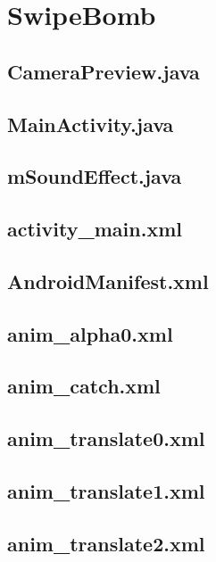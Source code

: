 \documentclass[11pt,a4j]{jarticle}
\begin{document}
\section{SwipeBomb}
\subsection{CameraPreview.java}
	
	\newpage
\subsection{MainActivity.java}
	
	\newpage
\subsection{mSoundEffect.java}
	
	\newpage

\subsection{activity\_main.xml}
	
	\newpage
\subsection{AndroidManifest.xml}
	
	\newpage
\subsection{anim\_alpha0.xml}
	
	\newpage
\subsection{anim\_catch.xml}
	
	\newpage
\subsection{anim\_translate0.xml}
	
	\newpage
\subsection{anim\_translate1.xml}
	
	\newpage
\subsection{anim\_translate2.xml}
	
	\newpage
\end{document}
